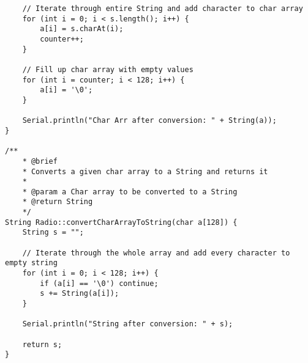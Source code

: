 \documentclass[a4paper, 11pt]{scrartcl}
\begin{document}
\begin{lstlisting}
    // Iterate through entire String and add character to char array
    for (int i = 0; i < s.length(); i++) {
        a[i] = s.charAt(i);
        counter++;
    }

    // Fill up char array with empty values
    for (int i = counter; i < 128; i++) {
        a[i] = '\0';
    }

    Serial.println("Char Arr after conversion: " + String(a));
}

/**
    * @brief 
    * Converts a given char array to a String and returns it
    * 
    * @param a Char array to be converted to a String
    * @return String 
    */
String Radio::convertCharArrayToString(char a[128]) {
    String s = "";

    // Iterate through the whole array and add every character to empty string
    for (int i = 0; i < 128; i++) {
        if (a[i] == '\0') continue;
        s += String(a[i]);
    }

    Serial.println("String after conversion: " + s);

    return s;
}
\end{lstlisting}
\end{document}
